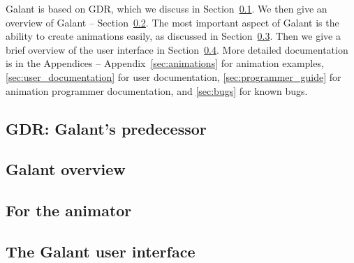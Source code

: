 Galant is based on GDR, which we discuss in Section~\ref{sec:gdr_features}.
We then give an overview of Galant -- Section~\ref{sec:galant_overview}.
The most important aspect of Galant is the ability to create animations easily,
as discussed in Section~\ref{sec:animator}.
Then we give a brief overview of the user interface in Section~\ref{sec:user_interface}.
More detailed documentation is in the Appendices --
Appendix~\ref{sec:animations} for animation examples,
\ref{sec:user_documentation} for user documentation,
\ref{sec:programmer_guide} for animation programmer documentation,
and \ref{sec:bugs} for known bugs.

\subsection{GDR: Galant's predecessor}
\label{sec:gdr_features}





\subsection{Galant overview}
\label{sec:galant_overview}


\subsection{For the animator}
\label{sec:animator}


%

\subsection{The Galant user interface}
\label{sec:user_interface}


